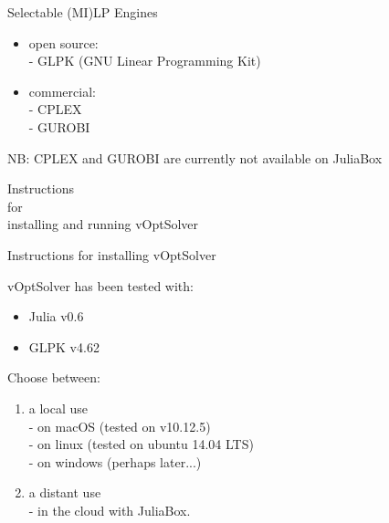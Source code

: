 \documentclass[10pt,xcolor=dvipsnames]{beamer}
\begin{document}
%
% 
\begin{frame}{Selectable (MI)LP Engines}

          \begin{itemize}
            \item   open source:\\   - GLPK (GNU Linear Programming Kit) %
            \medskip
            
            \item   commercial: \\  - CPLEX \\
            - GUROBI
          \end{itemize}  

\vspace{10mm}
NB: CPLEX and GUROBI are currently not available on JuliaBox
\end{frame}

%
% 
\begin{frame}

\begin{center}
{\Large
 \textcolor[RGB]{52,57,176}{
   Instructions \\ for \\ installing and running vOptSolver \\
 }
} 
\end{center}
\end{frame}

%
% 
\begin{frame}{Instructions for installing vOptSolver}

vOptSolver has been tested with:
\begin{itemize}
\item Julia v0.6
\item GLPK v4.62
\end{itemize}
\bigskip

Choose between:\\ 
\begin{enumerate}
\item a local use   \\
    \quad - on macOS (tested on v10.12.5) \\
    \quad  - on linux (tested on ubuntu 14.04 LTS) \\
    \quad  - on windows (perhaps later...)
\medskip
\item a distant use \\
     \quad - in the cloud with JuliaBox.
\end{enumerate}


\end{frame}
\end{document}
